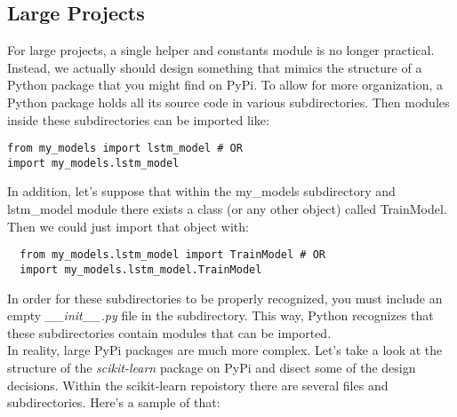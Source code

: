 \documentclass{article}%
\begin{document}
\subsection{Large Projects}
For large projects, a single helper and constants module is no longer practical.
Instead, we actually should design something that mimics the structure of a Python package
that you might find on PyPi. To allow for more organization, a Python package holds
all its source code in various subdirectories. Then modules inside these subdirectories
can be imported like:

\begin{lstlisting}
from my_models import lstm_model # OR
import my_models.lstm_model
\end{lstlisting}

In addition, let's suppose that within the my\_models subdirectory and 
lstm\_model module there exists a class (or any other object) called 
TrainModel. Then we could just import that object with:

\begin{lstlisting}
  from my_models.lstm_model import TrainModel # OR
  import my_models.lstm_model.TrainModel
\end{lstlisting}

In order for these subdirectories to be properly recognized, you must include an empty 
\textit{\_\_init\_\_.py} file in the subdirectory. This way, Python recognizes that these
subdirectories contain modules that can be imported. \\ 

In reality, large PyPi packages are much more complex. Let's take a look at the structure
of the \textit{scikit-learn} package on PyPi and disect some of the design decisions. Within
the scikit-learn repoistory there are several files and subdirectories. Here's a sample of that:
\end{document}
